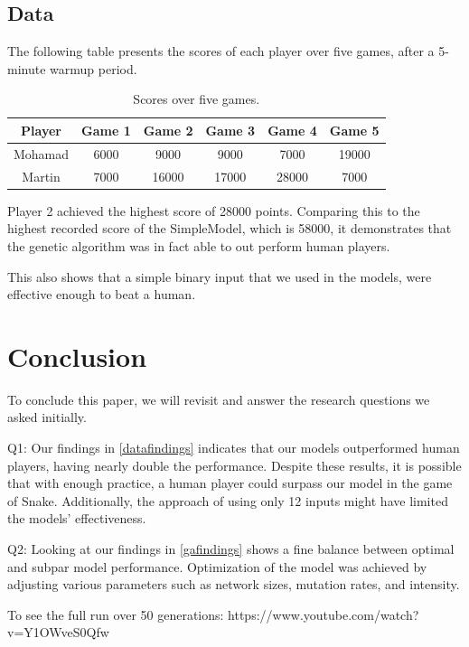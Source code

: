 \documentclass{article}
\begin{document}
\subsection{Data\label{datafindings}}


The following table presents the scores of each player over five games, after a 5-minute warmup period.

\begin{table}[h!]
\centering
\begin{tabular}{|c|c|c|c|c|c|}
\hline
\textbf{Player} & \textbf{Game 1} & \textbf{Game 2} & \textbf{Game 3} & \textbf{Game 4} & \textbf{Game 5} \\
\hline
Mohamad & 6000 & 9000 & 9000 & 7000 & 19000 \\
\hline
Martin & 7000 & 16000 & 17000 & 28000 & 7000 \\
\hline
\end{tabular}
\caption{Scores over five games.}
\label{tab:player_scores}
\end{table}

Player 2 achieved the highest score of 28000 points. Comparing this to the highest recorded score of the SimpleModel, which is 58000, it demonstrates that the genetic algorithm was in fact able to out perform human players.
\newline

This also shows that a simple binary input that we used in the models, were effective enough to beat a human.


\section{Conclusion}

To conclude this paper, we will revisit and answer the research questions we asked initially.

Q1: Our findings in \ref{datafindings} indicates that our models outperformed human players, having nearly double the performance. Despite these results, it is possible that with enough practice, a human player could surpass our model in the game of Snake. Additionally, the approach of using only 12 inputs might have limited the models' effectiveness.

Q2: Looking at our findings in \ref{gafindings} shows a fine balance between optimal and subpar model performance. Optimization of the model was achieved by adjusting various parameters such as network sizes, mutation rates, and intensity.


To see the full run over 50 generations: https://www.youtube.com/watch?v=Y1OWveS0Qfw


\end{document}
